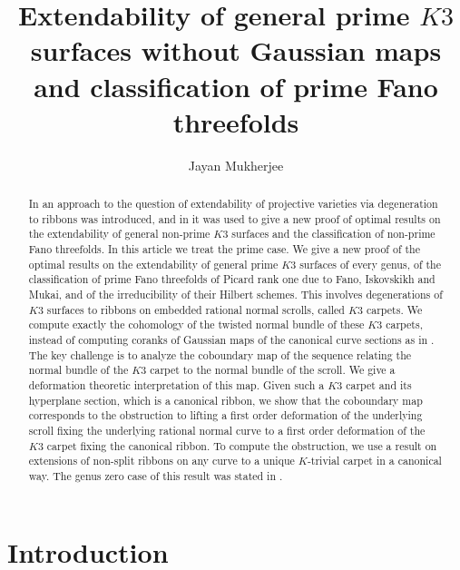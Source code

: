 \documentclass[11pt,twoside]{amsart}
\author@andify\authors
\title[Extendability of general prime $K3$ surfaces without Gaussian maps ]{Extendability of general prime $K3$ surfaces without Gaussian maps and classification of prime Fano threefolds}
\author{Jayan Mukherjee}
\theoremstyle{plain}
\theoremstyle{definition}
\begin{document}
\begin{abstract}
In \cite{BM24} an approach to the question of extendability of projective varieties via degeneration to ribbons was introduced, and in \cite{BM25} it was used to give a new proof of optimal results on the extendability of general non-prime $K3$ surfaces and the classification of non-prime Fano threefolds. In this article we treat the prime case. We give a new proof of the optimal results on the extendability of general prime $K3$ surfaces of every genus, of the classification of prime Fano threefolds of Picard rank one due to Fano, Iskovskikh and Mukai, and of the irreducibility of their Hilbert schemes. This involves degenerations of $K3$ surfaces to ribbons on embedded rational normal scrolls, called $K3$ carpets. We compute exactly the cohomology of the twisted normal bundle of these $K3$ carpets, instead of computing coranks of Gaussian maps of the canonical curve sections as in \cite{CLM93}. The key challenge is to analyze the coboundary map of the sequence relating the normal bundle of the $K3$ carpet to the normal bundle of the scroll. We give a deformation theoretic interpretation of this map. Given such a $K3$ carpet and its hyperplane section, which is a canonical ribbon, we show that the coboundary map corresponds to the obstruction to lifting a first order deformation of the underlying scroll fixing the underlying rational normal curve to a first order deformation of the $K3$ carpet fixing the canonical ribbon. To compute the obstruction, we use a result on extensions of non-split ribbons on any curve to a unique $K$-trivial carpet in a canonical way. The genus zero case of this result was stated in \cite{BE95}. %
\end{abstract}

\maketitle

\section{Introduction}
\end{document}

